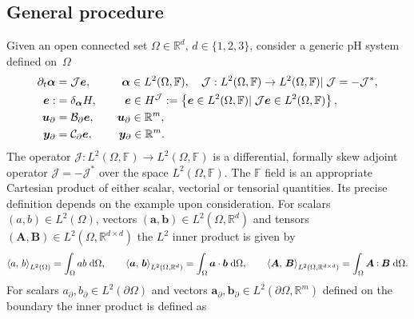 \subsection{General procedure}\label{sec:pfem_gen}
Given an open connected set $\Omega \in \mathbb{R}^d,\, d \in  \{1,2,3\}$, consider a generic pH system defined on~$\Omega$
\begin{subequations}
\label{eq:pHsys_2}
\begin{align}
\partial_t {\bm{\alpha}} &= \mathcal{J}\displaystyle \bm{e}, \qquad \;\;\, \bm{\alpha} \in L^2(\Omega, \mathbb{F}), \quad \mathcal{J}: L^2(\Omega, \mathbb{F}) \rightarrow L^2(\Omega, \mathbb{F}) \vert \;  \mathcal{J} = - \mathcal{J}^*, \label{eq:pHsys_dyn} \vspace{3pt}\\
\bm{e} :&= \displaystyle \delta_{\bm{\alpha}}H, \qquad \;\, \bm{e} \in H^\mathcal{J} :=\left\{\bm{e} \in L^2(\Omega, \mathbb{F}) \vert \; \mathcal{J}\bm{e} \in L^2(\Omega, \mathbb{F})  \right\}, \label{eq:pHsys_const} \\
\bm{u}_\partial &= \mathcal{B}_\partial  \displaystyle \bm{e}, \qquad \bm{u}_\partial \in \mathbb{R}^m, \label{eq:pHsys_u} \vspace{3pt}\\
\bm{y}_\partial &= \mathcal{C}_\partial \displaystyle \bm{e}, \qquad \; \bm{y}_\partial \in \mathbb{R}^m. \label{eq:pHsys_y} \vspace{3pt}
\end{align}
\end{subequations}
The operator $\mathcal{J}: L^2(\Omega, \mathbb{F}) \rightarrow L^2(\Omega, \mathbb{F})$ is a differential, formally skew adjoint operator $\mathcal{J} = - \mathcal{J}^*$ over the space $L^2(\Omega, \mathbb{F})$. The $\mathbb{F}$ field is an appropriate Cartesian product of either scalar, vectorial or tensorial quantities. Its precise definition depends on the example upon consideration. For scalars $(a,b) \in L^2(\Omega)$, vectors $(\bm{a}, \bm{b})\in L^2(\Omega, \mathbb{R}^d)$ and tensors  $(\bm{A}, \bm{B}) \in L^2(\Omega,\mathbb{R}^{d\times d})$ the $L^2$ inner product is given by 
\begin{equation}
\inner[L^2(\Omega)]{a}{b} = \int_{\Omega} a b \d\Omega, \qquad \inner[L^2(\Omega, \mathbb{R}^d)]{\bm{a}}{\bm{b}} = \int_{\Omega} \bm{a} \cdot \bm{b} \d\Omega, \qquad \inner[L^2(\Omega, \mathbb{R}^{d \times d})]{\bm{A}}{\bm{B}} = \int_{\Omega} \bm{A} \cddot \bm{B} \d\Omega.
\end{equation} 
For scalars ${a}_\partial, {b}_\partial \in L^2(\partial\Omega)$ and vectors  $\bm{a}_\partial, \bm{b}_\partial \in L^2(\partial\Omega, \mathbb{R}^m)$ defined on the boundary the inner product is defined as
